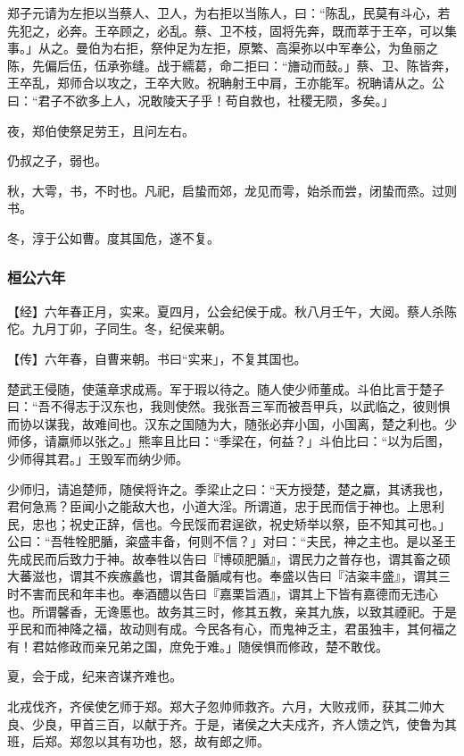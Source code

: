 \documentclass[]{article}
\begin{document}
郑子元请为左拒以当蔡人、卫人，为右拒以当陈人，曰：``陈乱，民莫有斗心，若先犯之，必奔。王卒顾之，必乱。蔡、卫不枝，固将先奔，既而萃于王卒，可以集事。」从之。曼伯为右拒，祭仲足为左拒，原繁、高渠弥以中军奉公，为鱼丽之陈，先偏后伍，伍承弥缝。战于繻葛，命二拒曰：``旝动而鼓。」蔡、卫、陈皆奔，王卒乱，郑师合以攻之，王卒大败。祝聃射王中肩，王亦能军。祝聃请从之。公曰：``君子不欲多上人，况敢陵天子乎！苟自救也，社稷无陨，多矣。」

夜，郑伯使祭足劳王，且问左右。

仍叔之子，弱也。

秋，大雩，书，不时也。凡祀，启蛰而郊，龙见而雩，始杀而尝，闭蛰而烝。过则书。

冬，淳于公如曹。度其国危，遂不复。

\hypertarget{header-n220}{%
\subsubsection{桓公六年}\label{header-n220}}

【经】六年春正月，实来。夏四月，公会纪侯于成。秋八月壬午，大阅。蔡人杀陈佗。九月丁卯，子同生。冬，纪侯来朝。

【传】六年春，自曹来朝。书曰``实来」，不复其国也。

楚武王侵随，使薳章求成焉。军于瑕以待之。随人使少师董成。斗伯比言于楚子曰：``吾不得志于汉东也，我则使然。我张吾三军而被吾甲兵，以武临之，彼则惧而协以谋我，故难间也。汉东之国随为大，随张必弃小国，小国离，楚之利也。少师侈，请羸师以张之。」熊率且比曰：``季梁在，何益？」斗伯比曰：``以为后图，少师得其君。」王毁军而纳少师。

少师归，请追楚师，随侯将许之。季梁止之曰：``天方授楚，楚之蠃，其诱我也，君何急焉？臣闻小之能敌大也，小道大淫。所谓道，忠于民而信于神也。上思利民，忠也；祝史正辞，信也。今民馁而君逞欲，祝史矫举以祭，臣不知其可也。」公曰：``吾牲牷肥腯，粢盛丰备，何则不信？」对曰：``夫民，神之主也。是以圣王先成民而后致力于神。故奉牲以告曰『博硕肥腯』，谓民力之普存也，谓其畜之硕大蕃滋也，谓其不疾瘯蠡也，谓其备腯咸有也。奉盛以告曰『洁粢丰盛』，谓其三时不害而民和年丰也。奉酒醴以告曰『嘉栗旨酒』，谓其上下皆有嘉德而无违心也。所谓馨香，无谗慝也。故务其三时，修其五教，亲其九族，以致其禋祀。于是乎民和而神降之福，故动则有成。今民各有心，而鬼神乏主，君虽独丰，其何福之有！君姑修政而亲兄弟之国，庶免于难。」随侯惧而修政，楚不敢伐。

夏，会于成，纪来咨谋齐难也。

北戎伐齐，齐侯使乞师于郑。郑大子忽帅师救齐。六月，大败戎师，获其二帅大良、少良，甲首三百，以献于齐。于是，诸侯之大夫戍齐，齐人馈之饩，使鲁为其班，后郑。郑忽以其有功也，怒，故有郎之师。
\end{document}
